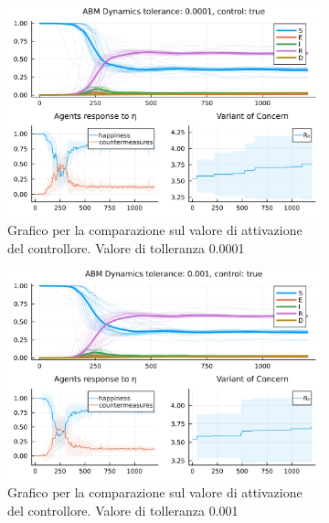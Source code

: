 \begin{figure}[H]
	\centering
	\begin{subfigure}[b]{0.45\textwidth}
		\centering
		\includegraphics[width=\textwidth]{img/SocialNetworkABM_1_TOL.jpg}
		\caption{Grafico per la comparazione sul valore di attivazione del controllore. Valore di tolleranza 0.0001}
		\label{fig:comparison_tol_1e-4}
	\end{subfigure}
	\hfill
	\begin{subfigure}[b]{0.45\textwidth}
		\centering
		\includegraphics[width=\textwidth]{img/SocialNetworkABM_2_TOL.jpg}
		\caption{Grafico per la comparazione sul valore di attivazione del controllore. Valore di tolleranza 0.001}
		\label{fig:comparison_tol_1e-3}
	\end{subfigure}
	\hfill
	\begin{subfigure}[b]{0.45\textwidth}
		\centering

\end{subfigure}
\end{figure}
